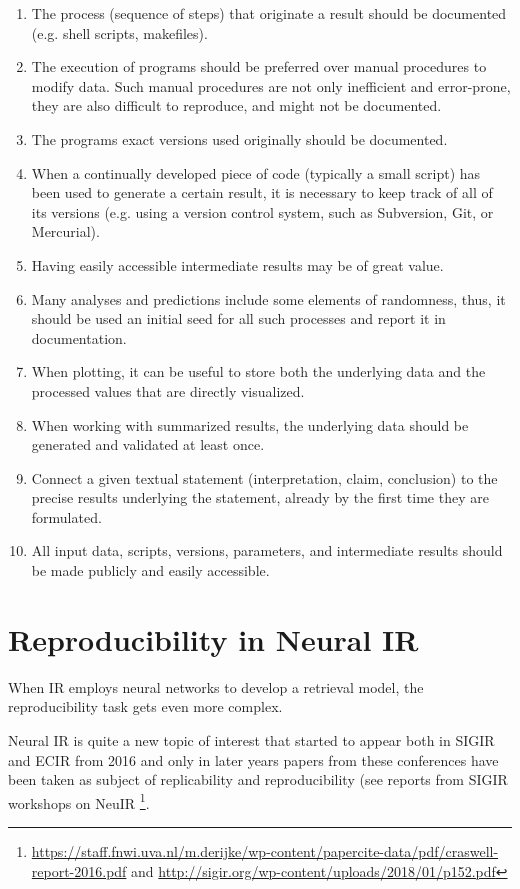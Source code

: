 \begin{enumerate}
    \item The process (sequence of steps) that originate a result should be documented (e.g. shell scripts, makefiles).
    \item The execution of programs should be preferred over manual procedures to modify data. Such manual procedures are not only inefficient and error-prone, they are also difficult to reproduce, and might not be documented.
    \item The programs exact versions used originally should be documented.
    \item When a continually developed piece of code (typically a small script) has been used to generate a certain result, it is necessary to keep track of all of its versions (e.g. using a version control system, such as Subversion, Git, or Mercurial).
    \item Having easily accessible intermediate results may be of great value.
    \item Many analyses and predictions include some elements of randomness, thus, it should be used an initial seed for all such processes and report it in documentation.
    \item When plotting, it can be useful to store both the underlying data and the processed values that are directly visualized.
    \item When working with summarized results, the underlying data should be generated and validated at least once.
    \item Connect a given textual statement (interpretation, claim, conclusion) to the precise results underlying the statement, already by the first time they are formulated.
    \item All input data, scripts, versions, parameters, and intermediate results should be made publicly and easily accessible.
\end{enumerate}

\section{Reproducibility in Neural IR}

When IR employs neural networks to develop a retrieval model, the reproducibility task gets even more complex.

Neural IR is quite a new topic of interest that started to appear both in SIGIR and ECIR from 2016 and only in later years papers from these conferences have been taken as subject of replicability and reproducibility (see reports from SIGIR workshops on NeuIR \footnote{\url{https://staff.fnwi.uva.nl/m.derijke/wp-content/papercite-data/pdf/craswell-report-2016.pdf} and \url{http://sigir.org/wp-content/uploads/2018/01/p152.pdf}}.

